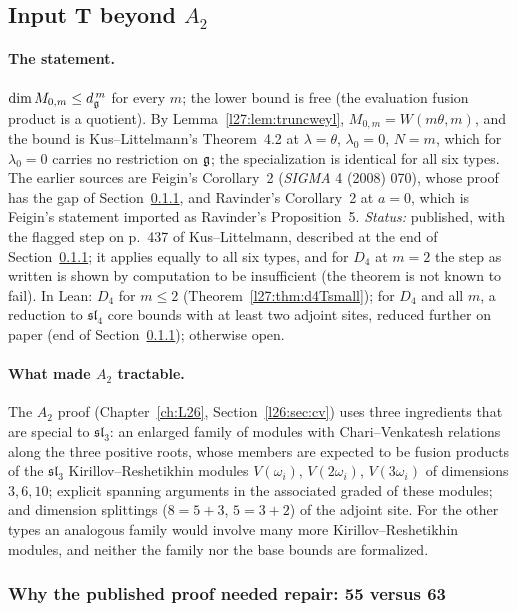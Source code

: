 \subsection{Input T beyond \texorpdfstring{$A_2$}{A2}}\label{l27:sec:a2core}

\paragraph{The statement.} $\dim M_{0,m}\le d_{\mathfrak g}^{\,m}$ for every $m$; the lower bound is free (the evaluation fusion product is
a quotient). By Lemma~\ref{l27:lem:truncweyl}, $M_{0,m}=W(m\theta,m)$, and the bound is Kus--Littelmann's Theorem~4.2 at $\lambda=\theta$,
$\lambda_0=0$, $N=m$, which for $\lambda_0=0$ carries no restriction on $\mathfrak g$; the specialization is identical for all six types.
The earlier sources are Feigin's Corollary~2 (\emph{SIGMA} 4 (2008) 070), whose proof has the gap of Section~\ref{l27:sec:feigin}, and
Ravinder's Corollary~2 at $a=0$, which is Feigin's statement imported as Ravinder's Proposition~5. \emph{Status:} published, with the
flagged step on p.~437 of Kus--Littelmann, described at the end of Section~\ref{l27:sec:feigin}; it applies equally to all six types,
and for $D_4$ at $m=2$ the step as written is shown by computation to be insufficient (the theorem is not known to fail).
In Lean: $D_4$ for $m\le2$ (Theorem~\ref{l27:thm:d4Tsmall}); for $D_4$ and all $m$, a reduction to $\mathfrak{sl}_4$ core bounds
with at least two adjoint sites, reduced further on paper (end of Section~\ref{l27:sec:feigin}); otherwise open.

\paragraph{What made $A_2$ tractable.} The $A_2$ proof (Chapter~\ref{ch:L26}, Section~\ref{l26:sec:cv}) uses three ingredients that are
special to $\mathfrak{sl}_3$: an enlarged family of modules with Chari--Venkatesh relations along the three positive roots, whose
members are expected to be fusion products of the $\mathfrak{sl}_3$ Kirillov--Reshetikhin modules $V(\omega_i)$, $V(2\omega_i)$, $V(3\omega_i)$
of dimensions $3,6,10$; explicit spanning arguments in the associated graded of these modules; and dimension splittings ($8=5+3$,
$5=3+2$) of the adjoint site. For the other types an analogous family would involve many more Kirillov--Reshetikhin modules, and
neither the family nor the base bounds are formalized.

\subsubsection{Why the published proof needed repair: 55 versus 63}\label{l27:sec:feigin}


